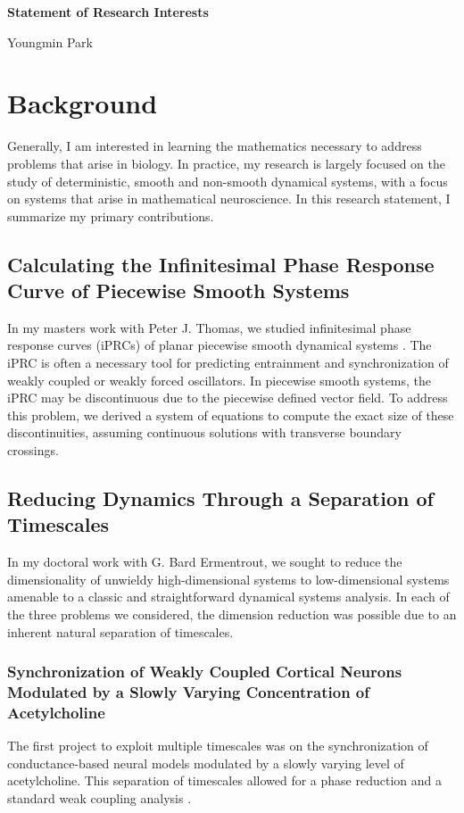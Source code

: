 \documentclass[a4paper,11pt]{article}
\begin{document}
\begin{center}
\Large \textbf{Statement of Research Interests}

\Large Youngmin Park
\end{center}


\section{Background}
Generally, I am interested in learning the mathematics necessary to address problems that arise in biology. In practice, my research is largely focused on the study of deterministic, smooth and non-smooth dynamical systems, with a focus on systems that arise in mathematical neuroscience. In this research statement, I summarize my primary contributions.

\subsection{Calculating the Infinitesimal Phase Response Curve of Piecewise Smooth Systems}
In my masters work with Peter J. Thomas, we studied infinitesimal phase response curves (iPRCs) of planar piecewise smooth dynamical systems \cite{park2013infinitesimal}. The iPRC is often a necessary tool for predicting entrainment and synchronization of weakly coupled or weakly forced oscillators. In piecewise smooth systems, the iPRC may be discontinuous due to the piecewise defined vector field. To address this problem, we derived a system of equations to compute the exact size of these discontinuities, assuming continuous solutions with transverse boundary crossings.

\subsection{Reducing Dynamics Through a Separation of Timescales}
In my doctoral work with G. Bard Ermentrout, we sought to reduce the dimensionality of unwieldy high-dimensional systems to low-dimensional systems amenable to a classic and straightforward dynamical systems analysis. In each of the three problems we considered, the dimension reduction was possible due to an inherent natural separation of timescales.

\subsubsection{Synchronization of Weakly Coupled Cortical Neurons Modulated by a Slowly Varying Concentration of Acetylcholine}
The first project to exploit multiple timescales was on the synchronization of conductance-based neural models modulated by a slowly varying level of acetylcholine. This separation of timescales allowed for a phase reduction and a standard weak coupling analysis \cite{park2016weakly}.
\end{document}
